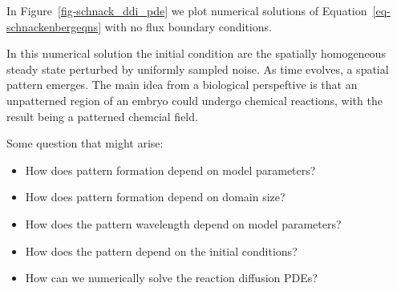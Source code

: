 \documentclass[
  letterpaper,
  DIV=11,
  numbers=noendperiod]{scrreprt}
\providecommand{\tightlist}{%
  \setlength{\itemsep}{0pt}\setlength{\parskip}{0pt}}\usepackage{longtable,booktabs,array}
\theoremstyle{plain}
\theoremstyle{definition}
\theoremstyle{plain}
\theoremstyle{remark}
\begin{document}
In Figure~\ref{fig-schnack_ddi_pde} we plot numerical solutions of
Equation~\ref{eq-schnackenbergeqns} with no flux boundary conditions.

In this numerical solution the initial condition are the spatially
homogeneous steady state perturbed by uniformly sampled noise. As time
evolves, a spatial pattern emerges. The main idea from a biological
perspeftive is that an unpatterned region of an embryo could undergo
chemical reactions, with the result being a patterned chemcial field.

Some question that might arise:

\begin{itemize}
\tightlist
\item
  How does pattern formation depend on model parameters?
\item
  How does pattern formation depend on domain size?
\item
  How does the pattern wavelength depend on model parameters?
\item
  How does the pattern depend on the initial conditions?
\item
  How can we numerically solve the reaction diffusion PDEs?
\end{itemize}
\end{document}

